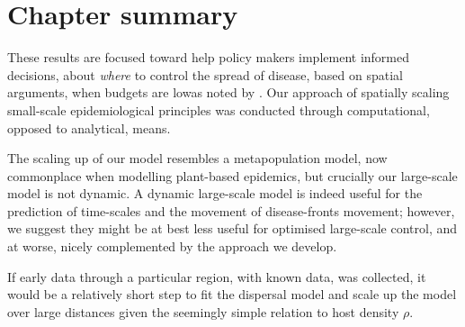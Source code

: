 \section{Chapter summary}



These results are focused toward help policy makers implement informed decisions, about \textit{where} to control the spread of disease, based on spatial arguments, when budgets are low\textemdash as noted by \cite{time-varying-infectivity}. Our approach of spatially scaling small-scale epidemiological principles was conducted through computational, opposed to analytical, means. 

The scaling up of our model resembles a metapopulation model, now commonplace when modelling plant-based epidemics, but crucially our large-scale model is not dynamic. A dynamic large-scale model is indeed useful for the prediction of time-scales and the movement of disease-fronts movement; however, we suggest they might be at best less useful for optimised large-scale control, and at worse, nicely complemented by the approach we develop.

If early data through a particular region, with known data, was collected, it would be a relatively short step to fit the dispersal model and scale up the model over large distances given the seemingly simple relation to host density $\rho$.

